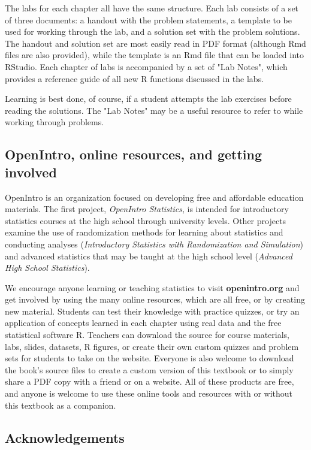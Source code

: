 The labs for each chapter all have the same structure. Each lab consists of a set of three documents: a handout with the problem statements, a template to be used for working through the lab, and a solution set with the problem solutions. The handout and solution set are most easily read in PDF format (although Rmd files are also provided), while the template is an Rmd file that can be loaded into RStudio. Each chapter of labs is accompanied by a set of "Lab Notes", which provides a reference guide of all new \textsf{R} functions discussed in the labs.

Learning is best done, of course, if a student attempts the lab exercises before reading the solutions. The "Lab Notes" may be a useful resource to refer to while working through problems.

\subsection*{OpenIntro, online resources, and getting involved}

OpenIntro is an organization focused on developing free and affordable education materials. The first project, \emph{OpenIntro Statistics}, is intended for introductory statistics courses at the high school through university levels. Other projects examine the use of randomization methods for learning about statistics and conducting analyses (\emph{Introductory Statistics with Randomization and Simulation}) and advanced statistics that may be taught at the high school level (\emph{Advanced High School Statistics}).

We encourage anyone learning or teaching statistics to visit \textbf{openintro.org} and get involved by using the many online resources, which are all free, or by creating new material. Students can test their knowledge with practice quizzes, or try an application of concepts learned in each chapter using real data and the free statistical software \textsf{R}. Teachers can download the source for course materials, labs, slides, datasets, \textsf{R} figures, or create their own custom quizzes and problem sets for students to take on the website. Everyone is also welcome to download the book's source files to create a custom version of this textbook or to simply share a PDF copy with a friend or on a website. All of these products are free, and anyone is welcome to use these online tools and resources with or without this textbook as a companion.


\subsection*{Acknowledgements}


